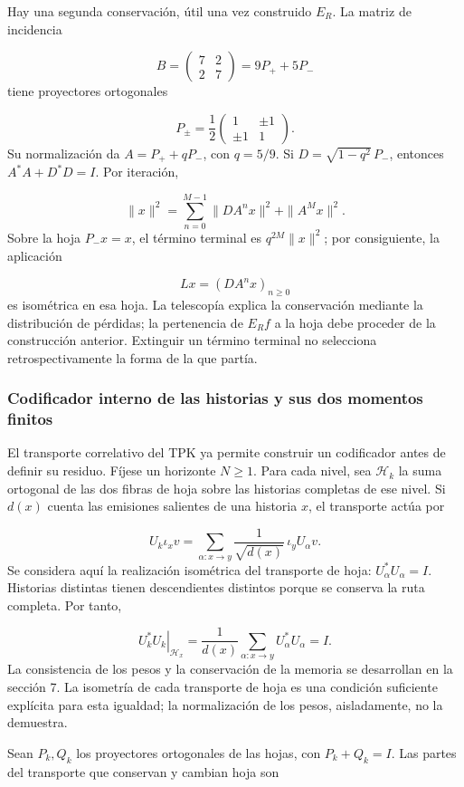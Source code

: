 Hay una segunda conservación, útil una vez construido \(E_R\). La matriz de incidencia

\[
B=\begin{pmatrix}7&2\\2&7\end{pmatrix}=9P_++5P_-
\]
tiene proyectores ortogonales

\[
P_\pm=\frac12
\begin{pmatrix}1&\pm1\\\pm1&1\end{pmatrix}.
\]
Su normalización da \(A=P_++qP_-\), con \(q=5/9\). Si \(D=\sqrt{1-q^2}\,P_-\), entonces \(A^*A+D^*D=I\). Por iteración,

\[
\|x\|^2=\sum_{n=0}^{M-1}\|DA^nx\|^2+\|A^Mx\|^2.
\]
Sobre la hoja \(P_-x=x\), el término terminal es \(q^{2M}\|x\|^2\); por consiguiente, la aplicación

\[
Lx=(DA^nx)_{n\geq0}
\]
es isométrica en esa hoja. La telescopía explica la conservación mediante la distribución de pérdidas; la pertenencia de \(E_Rf\) a la hoja debe proceder de la construcción anterior. Extinguir un término terminal no selecciona retrospectivamente la forma de la que partía.

\subsubsection*{Codificador interno de las historias y sus dos momentos finitos}
El transporte correlativo del TPK ya permite construir un codificador antes de definir su residuo. Fíjese un horizonte \(N\geq1\). Para cada nivel, sea \(\mathscr H_k\) la suma ortogonal de las dos fibras de hoja sobre las historias completas de ese nivel. Si \(d(x)\) cuenta las emisiones salientes de una historia \(x\), el transporte actúa por

\[
U_k\iota_xv=
\sum_{\alpha:x\to y}\frac1{\sqrt{d(x)}}\,\iota_yU_\alpha v.
\]
Se considera aquí la realización isométrica del transporte de hoja: \(U_\alpha^*U_\alpha=I\). Historias distintas tienen descendientes distintos porque se conserva la ruta completa. Por tanto,

\[
\left.U_k^*U_k\right|_{\mathscr H_x}
=\frac1{d(x)}\sum_{\alpha:x\to y}U_\alpha^*U_\alpha=I.
\]
La consistencia de los pesos y la conservación de la memoria se desarrollan en la sección 7. La isometría de cada transporte de hoja es una condición suficiente explícita para esta igualdad; la normalización de los pesos, aisladamente, no la demuestra.

Sean \(P_k,Q_k\) los proyectores ortogonales de las hojas, con \(P_k+Q_k=I\). Las partes del transporte que conservan y cambian hoja son

